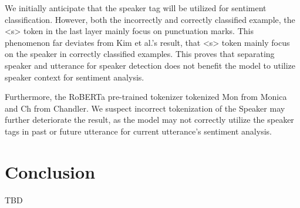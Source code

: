 \documentclass[11pt]{article}
\begin{document}
We initially anticipate that the speaker tag will be utilized for sentiment classification. However, both the incorrectly and correctly classified example, the <s> token in the last layer mainly focus on punctuation marks. This phenomenon far deviates from Kim et al.'s result, that <s> token mainly focus on the speaker in correctly classified examples. This proves that separating speaker and utterance for speaker detection does not benefit the model to utilize speaker context for sentiment analysis.

Furthermore, the RoBERTa pre-trained tokenizer tokenized Mon from Monica and Ch from Chandler. We suspect incorrect tokenization of the Speaker may further deteriorate the result, as the model may not correctly utilize the speaker tags in past or future utterance for current utterance's sentiment analysis.


\section{Conclusion}
\label{sect:conclusion}

TBD


\end{document}
